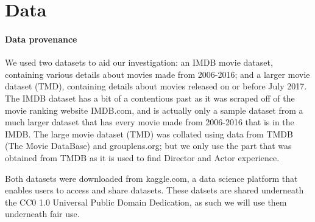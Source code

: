 \section{Data}

    \paragraph{Data provenance}
        We used two datasets to aid our investigation: an IMDB movie dataset, containing
            various details about movies made from 2006-2016; and a larger movie dataset (TMD),
            containing details about movies released on or before July 2017.
        The IMDB dataset has a bit of a contentious past as it was scraped off of the movie
            ranking website IMDB.com, and is actually only a sample dataset from a much larger
            dataset that has every movie made from 2006-2016 that is in the IMDB.
        The large movie dataset (TMD) was collated using data from TMDB (The Movie DataBase) and 
            grouplens.org; but we only use the part that was obtained from TMDB as it is used
            to find Director and Actor experience.

        Both datasets were downloaded from kaggle.com, a data science platform that enables users
            to access and share datasets. These datsets are shared underneath the CC0 1.0 Universal
            Public Domain Dedication, as such we will use them underneath fair use.

